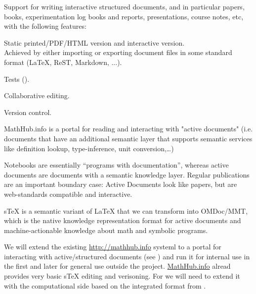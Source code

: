 \begin{workpackage}
\begin{tasklist}
\begin{task}[title=Structured documents,id=structdocs,lead=JU,PM=24]
  Support for writing interactive structured documents, and in
  particular papers, books, experimentation log books and reports,
  presentations, course notes, etc, with the following features:
  \begin{compactitem}
  \item Static printed/PDF/HTML version and interactive version.\\
    Achieved by either importing or exporting document files in some
    standard format (LaTeX, ReST, Markdown, ...).
  \item Tests ().
  \item Collaborative editing.
  \item Version control.
  \end{compactitem}
  MathHub.info is a portal for reading and interacting with "active documents"
  (i.e. documents that have an additional semantic layer that supports semantic services
  like definition lookup, type-inference, unit conversion,\ldots)

  Notebooks are essentially ``programs with documentation'', whereas active documents are
  documents with a semantic knowledge layer. Regular publications are an important
  boundary case: Active Documents look like papers, but are web-standards compatible and
  interactive.

  sTeX is a semantic variant of LaTeX that we can transform into OMDoc/MMT, which is the
  native knowledge representation format for active documents and machine-actionable
  knowledge about math and symbolic programs.
\end{task}

\begin{task}[id=mathhub,title=Active Documents Portal,lead=JU,PM=12]
  We will extend the existing \url{http://mathhub.info} systeml to a portal for
  interacting with active/structured documents (see ) and run it
  for internal use in the \TheProject first and later for general use outside the
  project. \url{MathHub.info} alread provides very basic sTeX editing and verisoning. For
  \TheProject we will need to extend it with the computational side based on the
  integrated format from .
\end{task}



\end{tasklist}
\end{workpackage}
